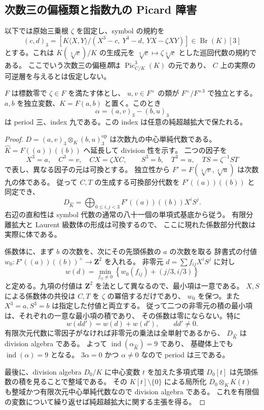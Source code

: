 \subsection{次数三の偏極類と指数九の Picard 障害}

以下では原始三乗根 $\zeta$ を固定し、symbol の規約を
\[
 (c,d)_3=
 \left[
 K\langle X,Y\rangle/
 (X^3-c,\ Y^3-d,\ YX-\zeta XY)
 \right]
 \in\operatorname{Br}(K)[3]
\]
とする。これは $K(\sqrt[3]{c})/K$ の生成元を
$\sqrt[3]{c}\mapsto\zeta\sqrt[3]{c}$ とした巡回代数の規約である。
ここでいう次数三の偏極\emph{類}は
$\operatorname{Pic}^3_{C/K}(K)$ の元であり、
$C$ 上の実際の可逆層を与えるとは仮定しない。

\begin{lemma}
\label{lem:nfm-bisymbol-index-nine}
$F$ は標数零で $\zeta\in F$ を満たす体とし、
$u,v\in F^\times$ の類が $F^\times/F^{\times3}$ で独立とする。
$a,b$ を独立変数、$K=F(a,b)$ と置く。このとき
\[
 \alpha=(a,v)_3-(b,u)_3
\]
は period 三、index 九である。この index は任意の純超越拡大で保たれる。
\end{lemma}

\begin{proof}
$D=(a,v)_3\otimes_K(b,u)_3^{\mathrm{op}}$ は次数九の中心単純代数である。
$\widehat K=F((a))((b))$ へ延長して division 性を示す。
二つの因子を
\[
 X^3=a,\quad C^3=v,\quad CX=\zeta XC,
 \qquad
 S^3=b,\quad T^3=u,\quad TS=\zeta^{-1}ST
\]
で表し、異なる因子の元は可換とする。
独立性から $F'=F(\sqrt[3]{v},\sqrt[3]{u})$ は次数九の体である。
従って $C,T$ の生成する可換部分代数を
$F'((a))((b))$ と同定でき、
\[
 D_{\widehat K}
   =\bigoplus_{0\le i,j<3}F'((a))((b))X^iS^j.
\]
右辺の直和性は symbol 代数の通常の八十一個の単項式基底から従う。
有限分離拡大と Laurent 級数体の形成は可換するので、
ここに現れた係数部分代数は実際に体である。

係数体に、まず $b$ の次数を、次にその先頭係数の $a$ の次数を取る
辞書式の付値 $w_0:F'((a))((b))^\times\to\mathbf Z^2$ を入れる。
非零元 $d=\sum f_{ij}X^iS^j$ に対し
\[
 w(d)=\min_{f_{ij}\ne0}
 \left\{w_0(f_{ij})+(j/3,i/3)\right\}
\]
と定める。九項の付値は $\mathbf Z^2$ を法として異なるので、最小項は一意である。
$X,S$ による係数体の共役は $C,T$ を $\zeta$ の冪倍するだけであり、
$w_0$ を保つ。また $X^3=a,S^3=b$ は指定した付値と両立する。
従って二つの非零元の積の最小項は、それぞれの一意な最小項の積であり、
その係数は零にならない。特に
\[
 w(dd')=w(d)+w(d'),\qquad dd'\ne0.
\]
有限次元代数に零因子がなければ非零元の乗法は全単射であるから、
$D_{\widehat K}$ は division algebra である。
よって $\operatorname{ind}(\alpha_{\widehat K})=9$ であり、
基礎体上でも $\operatorname{ind}(\alpha)=9$ となる。
$3\alpha=0$ かつ $\alpha\ne0$ なので period は三である。

最後に、division algebra $D_0/K$ に中心変数 $t$ を加えた多項式環
$D_0[t]$ は先頭係数の積を見ることで整域である。
その $K[t]\setminus\{0\}$ による局所化
$D_0\otimes_KK(t)$ も整域かつ有限次元中心単純代数なので division algebra である。
これを有限個の変数について繰り返せば純超越拡大に関する主張を得る。
\end{proof}

